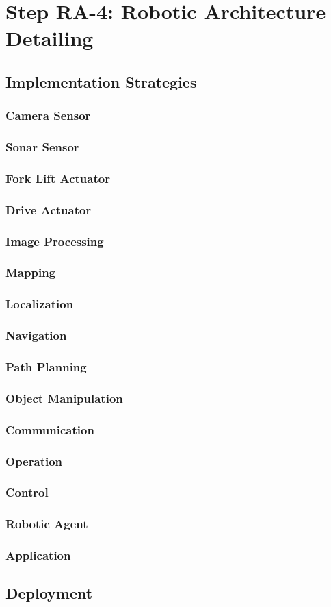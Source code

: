 \section{Step RA-4: Robotic Architecture Detailing}
\subsection{Implementation Strategies}
\subsubsection*{Camera Sensor}
\subsubsection*{Sonar Sensor}
\subsubsection*{Fork Lift Actuator}
\subsubsection*{Drive Actuator}
\subsubsection*{Image Processing}
\subsubsection*{Mapping}
\subsubsection*{Localization}
\subsubsection*{Navigation}
\subsubsection*{Path Planning}
\subsubsection*{Object Manipulation}
\subsubsection*{Communication}
\subsubsection*{Operation}
\subsubsection*{Control}
\subsubsection*{Robotic Agent}
\subsubsection*{Application}

\subsection{Deployment}